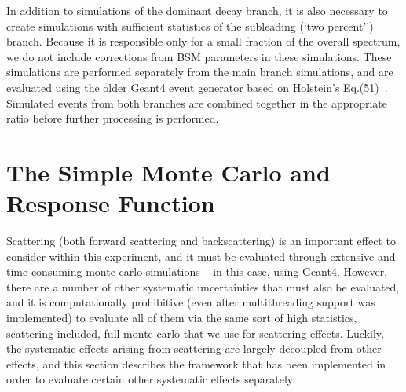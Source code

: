 
In addition to simulations of the dominant decay branch, it is also necessary to create simulations with sufficient statistics of the subleading (`two percent'') branch.  Because it is responsible only for a small fraction of the overall spectrum, we do not include corrections from BSM parameters in these simulations.  These simulations are performed separately from the main branch simulations, and are evaluated using the older Geant4 event generator based on Holstein's Eq.(51)~\cite{holstein}.  Simulated events from both branches are combined together in the appropriate ratio before further processing is performed.


\FloatBarrier
\section{The Simple Monte Carlo and Response Function}
\label{sec:responsefunction}
Scattering (both forward scattering and backscattering) is an important effect to consider within this experiment, and it must be evaluated through extensive and time consuming monte carlo simulations -- in this case, using Geant4.  However, there are a number of other systematic uncertainties that must also be evaluated, and it is computationally prohibitive (even after multithreading support was implemented) to evaluate all of them via the same sort of high statistics, scattering included, full monte carlo that we use for scattering effects.  Luckily, the systematic effects arising from scattering are largely decoupled from other effects, and this section describes the framework that has been implemented in order to evaluate certain other systematic effects separately.  



